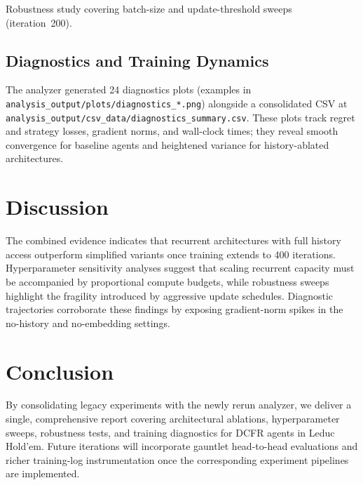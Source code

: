 \documentclass[11pt]{article}
\begin{document}
\begin{table}[H]
    \centering
    \caption{Robustness study covering batch-size and update-threshold sweeps (iteration~200).}
    \label{tab:robustness-summary}
    
\end{table}

\subsection{Diagnostics and Training Dynamics}
The analyzer generated 24 diagnostics plots (examples in \texttt{analysis\_output/plots/diagnostics\_*.png}) alongside a consolidated CSV at \texttt{analysis\_output/csv\_data/diagnostics\_summary.csv}. These plots track regret and strategy losses, gradient norms, and wall-clock times; they reveal smooth convergence for baseline agents and heightened variance for history-ablated architectures.

\section{Discussion}
The combined evidence indicates that recurrent architectures with full history access outperform simplified variants once training extends to 400 iterations. Hyperparameter sensitivity analyses suggest that scaling recurrent capacity must be accompanied by proportional compute budgets, while robustness sweeps highlight the fragility introduced by aggressive update schedules. Diagnostic trajectories corroborate these findings by exposing gradient-norm spikes in the no-history and no-embedding settings.

\section{Conclusion}
By consolidating legacy experiments with the newly rerun analyzer, we deliver a single, comprehensive report covering architectural ablations, hyperparameter sweeps, robustness tests, and training diagnostics for DCFR agents in Leduc Hold'em. Future iterations will incorporate gauntlet head-to-head evaluations and richer training-log instrumentation once the corresponding experiment pipelines are implemented.



\end{document}
